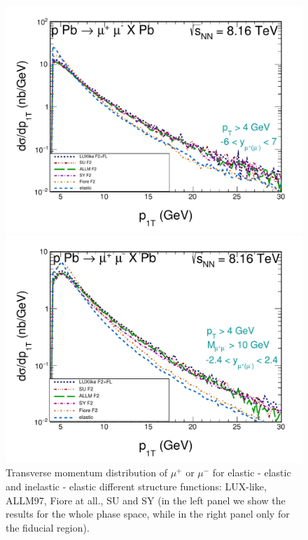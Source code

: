 \begin{figure}[!htbp]
\begin{minipage}{0.47\textwidth}
 \centerline{\includegraphics[width=1.0\textwidth]{figures_Marta/pt1.pdf}}
\end{minipage}
\begin{minipage}{0.47\textwidth}
 \centerline{\includegraphics[width=1.0\textwidth]{figures_Marta/pt1-c.pdf}}
\end{minipage}
\caption{
Transverse momentum distribution of $\mu^+$ or $\mu^-$ 
for elastic - elastic and inelastic - elastic different structure functions: LUX-like, ALLM97, Fiore at all., SU and SY (in the left panel we show the results for the whole phase space, while in the right panel only for the fiducial region).
}
 \label{fig:dsig_dMWW_ineine}
\end{figure}


